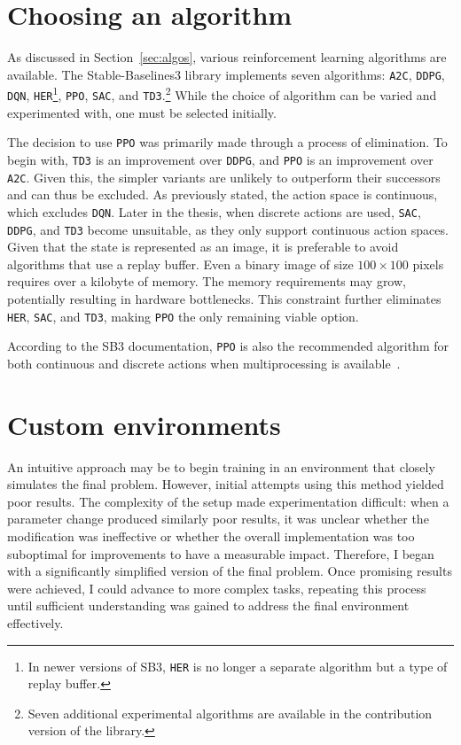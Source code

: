 \documentclass[
  digital,     %
  oneside,     %
  nosansbold,  %
  nocolorbold, %
  lof,         %
  lot,         %
]{fithesis4}
\begin{document}
\section{Choosing an algorithm}
\label{sec:algo_choice}
As discussed in Section~\ref{sec:algos}, various reinforcement learning algorithms are available. The Stable-Baselines3 library implements seven algorithms: \texttt{A2C}, \texttt{DDPG}, \texttt{DQN}, \texttt{HER}\footnote{In newer versions of SB3, \texttt{HER} is no longer a separate algorithm but a type of replay buffer.}, \texttt{PPO}, \texttt{SAC}, and \texttt{TD3}.\footnote{Seven additional experimental algorithms are available in the contribution version of the library.} While the choice of algorithm can be varied and experimented with, one must be selected initially.

The decision to use \texttt{PPO} was primarily made through a process of elimination. To begin with, \texttt{TD3} is an improvement over \texttt{DDPG}, and \texttt{PPO} is an improvement over \texttt{A2C}. Given this, the simpler variants are unlikely to outperform their successors and can thus be excluded. As previously stated, the action space is continuous, which excludes \texttt{DQN}. Later in the thesis, when discrete actions are used, \texttt{SAC}, \texttt{DDPG}, and \texttt{TD3} become unsuitable, as they only support continuous action spaces. Given that the state is represented as an image, it is preferable to avoid algorithms that use a replay buffer. Even a binary image of size $100\times100$ pixels requires over a kilobyte of memory. The memory requirements may grow, potentially resulting in hardware bottlenecks. This constraint further eliminates \texttt{HER}, \texttt{SAC}, and \texttt{TD3}, making \texttt{PPO} the only remaining viable option.

According to the SB3 documentation, \texttt{PPO} is also the recommended algorithm for both continuous and discrete actions when multiprocessing is available~\cite{SB3-docs}.

\section{Custom environments}
An intuitive approach may be to begin training in an environment that closely simulates the final problem. However, initial attempts using this method yielded poor results. The complexity of the setup made experimentation difficult: when a parameter change produced similarly poor results, it was unclear whether the modification was ineffective or whether the overall implementation was too suboptimal for improvements to have a measurable impact. Therefore, I began with a significantly simplified version of the final problem. Once promising results were achieved, I could advance to more complex tasks, repeating this process until sufficient understanding was gained to address the final environment effectively.
\end{document}
